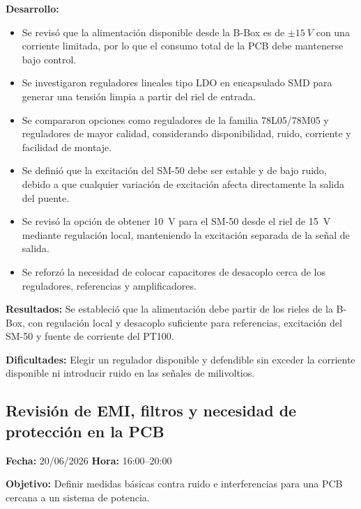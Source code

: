 \documentclass[12pt]{article}
\begin{document}
\textbf{Desarrollo:}
\begin{itemize}
\item Se revisó que la alimentación disponible desde la B-Box es de \(\pm\SI{15}{V}\) con una corriente limitada, por lo que el consumo total de la PCB debe mantenerse bajo control.
\item Se investigaron reguladores lineales tipo LDO en encapsulado SMD para generar una tensión limpia a partir del riel de entrada.
\item Se compararon opciones como reguladores de la familia 78L05/78M05 y reguladores de mayor calidad, considerando disponibilidad, ruido, corriente y facilidad de montaje.
\item Se definió que la excitación del SM-50 debe ser estable y de bajo ruido, debido a que cualquier variación de excitación afecta directamente la salida del puente.
\item Se revisó la opción de obtener \SI{10}{V} para el SM-50 desde el riel de \SI{15}{V} mediante regulación local, manteniendo la excitación separada de la señal de salida.
\item Se reforzó la necesidad de colocar capacitores de desacoplo cerca de los reguladores, referencias y amplificadores.
\end{itemize}

\textbf{Resultados:}
Se estableció que la alimentación debe partir de los rieles de la B-Box, con regulación local y desacoplo suficiente para referencias, excitación del SM-50 y fuente de corriente del PT100.

\textbf{Dificultades:}
Elegir un regulador disponible y defendible sin exceder la corriente disponible ni introducir ruido en las señales de milivoltios.

\subsection{Revisión de EMI, filtros y necesidad de protección en la PCB}
\textbf{Fecha:} 20/06/2026 \quad \textbf{Hora:} 16:00--20:00

\textbf{Objetivo:}
Definir medidas básicas contra ruido e interferencias para una PCB cercana a un sistema de potencia.
\end{document}

